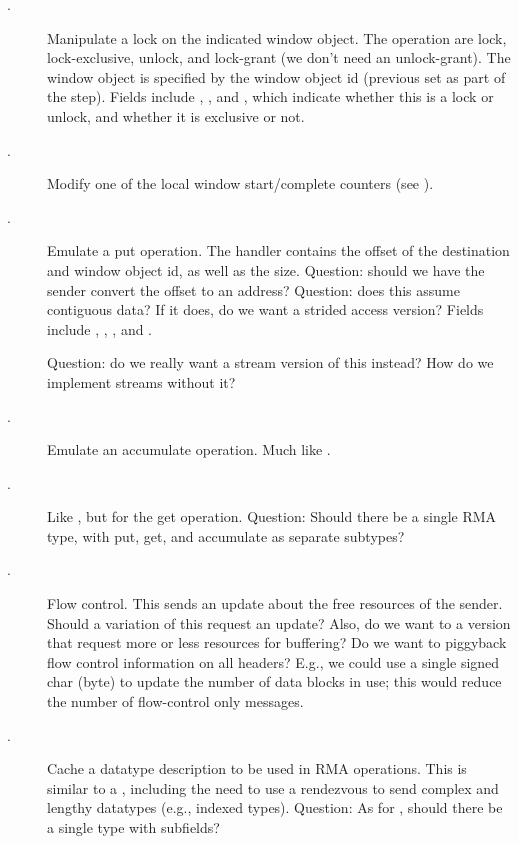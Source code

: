 \documentclass{article}
\begin{document}
\begin{tcp}
\begin{description}
\item[.]Manipulate a lock on the indicated
window object.  The operation are lock, lock-exclusive, unlock, and
lock-grant (we don't need an unlock-grant).  The window object is
specified by the window object id (previous set as part of the
 step).
Fields include ,
, and
, which indicate whether this is a lock
or unlock, and whether it is exclusive or not.

\item[.]Modify one of the local window
start/complete counters (see ).  

\item[.]Emulate a put operation.  The handler
contains the offset of the destination and window object id, as well
as the size.  
Question: should we have the sender convert the offset to an address?
Question: does this assume contiguous data?  If it does, do we want a
strided access version?
Fields include ,
, ,
and .

Question: do we really want a stream version of this instead?  How do
we implement streams without it?

\item[.]Emulate an accumulate
operation.  Much like .

\item[.]Like , but for
the get operation.  Question: Should there be a single RMA type, with
put, get, and accumulate as separate subtypes?

\item[.]Flow control.  This sends an update
about the free resources of the sender.  Should a variation of this
request an update?  Also, do we want to a version that request more or
less resources for buffering?  Do we want to piggyback flow control
information on all headers?  E.g., we could use a single signed char
(byte) to update the number of data blocks in use; this would reduce
the number of flow-control only messages.

\item[.]Cache a datatype description
to be used in RMA operations.  This is similar to a
, including the need to use a
rendezvous to send complex and lengthy datatypes (e.g., indexed
types).
Question: As for , should there be a
single type with subfields?  


\end{description}
\end{tcp}
\end{document}
